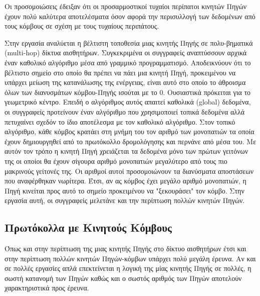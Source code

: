 
Οι προσομοιώσεις έδειξαν ότι οι προσαρμοστικοί τυχαίοι περίπατοι κινητών Πηγών έχουν πολύ καλύτερα αποτελέσματα όσον αφορά την περισυλλογή των δεδομένων από τους
κόμβους σε σχέση με τους τυχαίους περιπάτους.

Στην εργασία \cite{deploying_multiple_sinks_wsns} αναλύεται η βέλτιστη τοποθεσία μιας κινητής Πηγής σε πολυ-βηματικά (multi-hop) δίκτυα αισθητήρων. Συγκεκριμένα οι
συγγραφείς αναπτύσσουν αρχικά έναν καθολικό αλγόριθμο μέσα από γραμμικό προγραμματισμό. Αποδεικνύουν ότι το βέλτιστο σημείο στο οποίο θα πρέπει να πάει μια κινητή
Πηγή, προκειμένου να υπάρχει μείωση της κατανάλωσης της ενέργειας, είναι αυτό στο οποίο το άθροισμα όλων των διανυσμάτων κόμβου-Πηγής ισούται με το 0. Ουσιαστικά
πρόκειται για το γεωμετρικό κέντρο. Επειδή ο αλγόριθμος αυτός απαιτεί καθολικά (global) δεδομένα, οι συγγραφείς προτείνουν έναν αλγόριθμο που χρησιμοποιεί τοπικά
δεδομένα αλλά πετυχαίνει σχεδόν το ίδιο αποτέλεσμα με τον καθολικό αλγόριθμο. Στον τοπικό αλγόριθμο, κάθε κόμβος κρατάει στη μνήμη του τον αριθμό των μονοπατιών τα
οποία έχουν δημιουργηθεί από το πρωτόκολλο δρομολόγησης και περνάνε από μέσα του. Με αυτόν τον τρόπο η κινητή Πηγή χρειάζεται τα δεδομένα μόνο των πρώτων γειτόνων
της οι οποίοι θα έχουν σίγουρα αριθμό μονοπατιών μεγαλύτερο από τους πιο μακρινούς γείτονές της. Οι αριθμοί αυτοί προσομοιώνουν τα διανύσματα αποστάσεων που
αναφέρθηκαν νωρίτερα. Έτσι, αν ας κόμβος έχει μεγάλο αριθμό μονοπατιών, η Πηγή κινείται προς αυτό το σημείο προκειμένου να "ξεκουράσει" τον κόμβο. Στην εργασία αυτή,
οι συγγραφείς μελετάνε και την περίπτωση πολλών κινητών Πηγών.

\subsection{Πρωτόκολλα με Κινητούς Κόμβους} %
Όπως και στην περίπτωση της μιας κινητής Πηγής στο δίκτυο αισθητήρων έτσι και στην περίπτωση πολλών κινητών Πηγών-κόμβων υπάρχει πολύ μεγάλη έρευνα. Αν και σε πολλές
εργασίες απλά επεκτείνεται η λογική της μίας κινητής Πηγής σε πολλές, η σωστή κατανομή των Πηγών καθώς και ο σωστός αριθμός των Πηγών αποτελούν χαρακτηριστικά προς
έρευνα.

